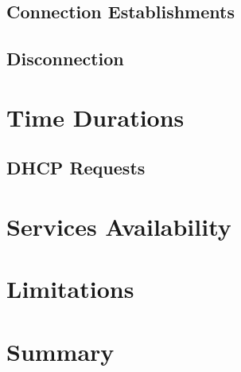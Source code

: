 \subsection{Connection Establishments}

\subsection{Disconnection}




\section{Time Durations}
\subsection{DHCP Requests}



\section{Services Availability}
















\section{Limitations}




\section{Summary}

